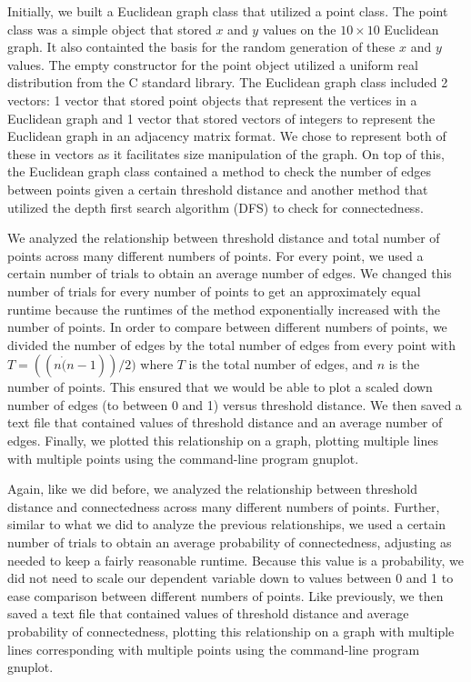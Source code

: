 \documentclass[11pt]{article}
\begin{document}
Initially, we built a Euclidean graph class that utilized a point class. The point class was a simple object that stored $x$ and $y$ values on the $10 \times 10$ Euclidean graph. It also containted the basis for the random generation of these $x$ and $y$ values. The empty constructor for the point object utilized a uniform real distribution from the C standard library. The Euclidean graph class included 2 vectors: 1 vector that stored point objects that represent the vertices in a Euclidean graph and 1 vector that stored vectors of integers to represent the Euclidean graph in an adjacency matrix format. We chose to represent both of these in vectors as it facilitates size manipulation of the graph. On top of this, the Euclidean graph class contained a method to check the number of edges between points given a certain threshold distance and another method that utilized the depth first search algorithm (DFS) to check for connectedness.

We analyzed the relationship between threshold distance and total number of points across many different numbers of points. For every point, we used a certain number of trials to obtain an average number of edges. We changed this number of trials for every number of points to get an approximately equal runtime because the runtimes of the method exponentially increased with the number of points. In order to compare between different numbers of points, we divided the number of edges by the total number of edges from every point with $T = ((n \dot (n - 1)) / 2)$ where $T$ is the total number of edges, and $n$ is the number of points. This ensured that we would be able to plot a scaled down number of edges (to between 0 and 1) versus threshold distance. We then saved a text file that contained values of threshold distance and an average number of edges. Finally, we plotted this relationship on a graph, plotting multiple lines with multiple points using the command-line program gnuplot.

Again, like we did before, we analyzed the relationship between threshold distance and connectedness across many different numbers of points. Further, similar to what we did to analyze the previous relationships, we used a certain number of trials to obtain an average probability of connectedness, adjusting as needed to keep a fairly reasonable runtime. Because this value is a probability, we did not need to scale our dependent variable down to values between 0 and 1 to ease comparison between different numbers of points. Like previously, we then saved a text file that contained values of threshold distance and average probability of connectedness, plotting this relationship on a graph with multiple lines corresponding with multiple points using the command-line program gnuplot.
\end{document}
